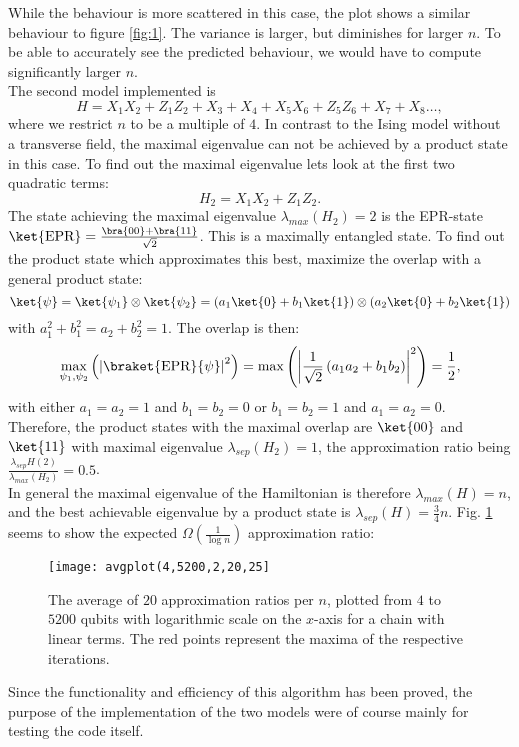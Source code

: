 \noindent While the behaviour is more scattered in this case, the plot shows a similar behaviour to figure \ref{fig:1}.
The variance is larger, but diminishes for larger $n$.
To be able to accurately see the predicted behaviour, we would have to compute significantly larger $n$.\\\newpage
\noindent The second model implemented is \[
	H =  X_1X_{2}+Z_1Z_{2}+X_{3}+X_{4}+X_5X_{6}+Z_5Z_{6}+X_{7}+X_{8}\ldots
,\]
where we restrict $n$ to be a multiple of $4$.
In contrast to the Ising model without a transverse field, the maximal eigenvalue can not be achieved by a product state in this case.
To find out the maximal eigenvalue lets look at the first two quadratic terms:
\[
H_2=X_1X_2+Z_1Z_2
.\]
The state achieving the maximal eigenvalue $\lambda_{max}(H_2)=2$ is the EPR-state $\ket{\text{EPR}}=\frac{\bra{00}+\bra{11}}{\sqrt{2}}$.
This is a maximally entangled state.
To find out the product state which approximates this best, maximize the overlap with a general product state:
\[
	\ket{\psi}=\ket{\psi_1}\otimes\ket{\psi_2}=\left(a_1\ket{0}+b_1\ket{1}\right)\otimes\left(a_2\ket{0}+b_2\ket{1}\right)
\] with $a_1^2+b_1^2=a_2+b_2^2=1$.
The overlap is then:\[
\max_{\psi_1,\psi_2}\left(\left|\braket{\text{EPR}}{\psi}\right|^2\right)=\max\left(\left|\frac{1}{\sqrt{2}}\left(a_1a_2+b_1b_2\right)\right|^2\right)=\frac{1}{2}
,\]
with either $a_1=a_2=1$ and $b_1=b_2=0$ or $b_1=b_2=1$ and $a_1=a_2=0$.
Therefore, the product states with the maximal overlap are $\ket{00}$ and $\ket{11}$ with maximal eigenvalue $\lambda_{sep}(H_2)=1$, the approximation ratio being  $\frac{\lambda_{sep}H(2)}{\lambda_{max}(H_2)} = 0.5$.\\
In general the maximal eigenvalue of the Hamiltonian is therefore $\lambda_{max}(H)=n$, and the best achievable eigenvalue by a product state is $\lambda_{sep}(H)=\frac{3}{4}n$.
Fig. \ref{fig:3} seems to show the expected $\Omega\left( \frac{1}{\log{}n} \right) $ approximation ratio:
\begin{figure}[h]
	\centering
	\texttt{[image: avgplot(4,5200,2,20,25]}
	\caption{The average of $20$ approximation ratios per $n$, plotted from $4$ to $5200$ qubits with logarithmic scale on the $x$-axis for a chain with linear terms. The red points represent the maxima of the respective iterations.}
	\label{fig:3}
\end{figure}
\noindent Since the functionality and efficiency of this algorithm has been proved, the purpose of the implementation of the two models were of course mainly for testing the code itself.
